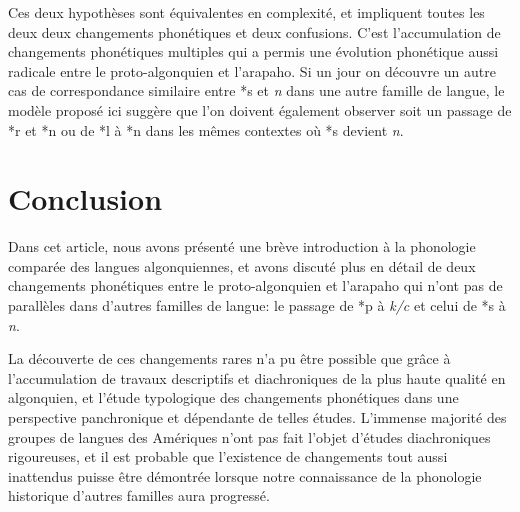 \documentclass[twoside,a4paper,11pt]{article}
\newcommand{\ipa}[1]{{\phon\textit{#1}}}
\newcommand{\Σ}{\greek{Σ}}
\begin{document}
Ces deux hypothèses sont équivalentes en complexité, et impliquent toutes les deux deux changements phonétiques et deux confusions. C'est l'accumulation de changements phonétiques multiples qui a permis une évolution phonétique aussi radicale entre le proto-algonquien et l'arapaho. Si un jour on découvre un autre cas de correspondance similaire entre *s et \ipa{n} dans une autre famille de langue, le modèle proposé ici suggère que l'on doivent également observer soit un passage de *r et *n ou de *l à *n dans les mêmes contextes où *s devient \ipa{n}.

\section{Conclusion}	
Dans cet article, nous avons présenté une brève introduction à la phonologie comparée des langues algonquiennes, et avons discuté plus en détail de deux changements phonétiques entre le proto-algonquien et l'arapaho qui n'ont pas de parallèles dans d'autres familles de langue: le passage de *p à \ipa{k/c} et celui de *s à \ipa{n}. 

La découverte de ces changements rares n'a pu être possible que grâce à l'accumulation de travaux descriptifs et diachroniques de la plus haute qualité en algonquien, et l'étude typologique des changements phonétiques dans une perspective panchronique et dépendante de telles études. L'immense majorité des groupes de langues des Amériques n'ont pas fait l'objet d'études diachroniques rigoureuses, et il est probable que l'existence de changements tout aussi inattendus puisse être démontrée lorsque notre connaissance de la phonologie historique d'autres familles aura progressé.

 
 
 
\end{document}
